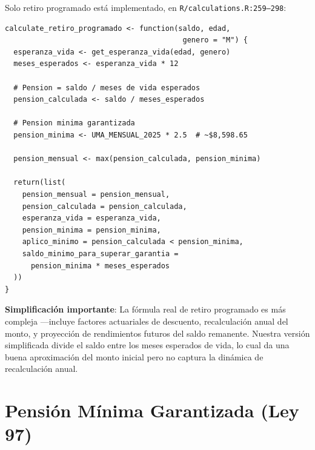 \documentclass[11pt,a4paper]{report}
\begin{document}
\begin{tcolorbox}[colback=orange!5!white, colframe=orange!75!black, title=\textbf{Aplicaci\'on en C\'odigo}]
Solo retiro programado est\'a implementado, en \texttt{R/calculations.R:259--298}:

\begin{lstlisting}
calculate_retiro_programado <- function(saldo, edad,
                                         genero = "M") {
  esperanza_vida <- get_esperanza_vida(edad, genero)
  meses_esperados <- esperanza_vida * 12

  # Pension = saldo / meses de vida esperados
  pension_calculada <- saldo / meses_esperados

  # Pension minima garantizada
  pension_minima <- UMA_MENSUAL_2025 * 2.5  # ~$8,598.65

  pension_mensual <- max(pension_calculada, pension_minima)

  return(list(
    pension_mensual = pension_mensual,
    pension_calculada = pension_calculada,
    esperanza_vida = esperanza_vida,
    pension_minima = pension_minima,
    aplico_minimo = pension_calculada < pension_minima,
    saldo_minimo_para_superar_garantia =
      pension_minima * meses_esperados
  ))
}
\end{lstlisting}

\textbf{Simplificaci\'on importante}: La f\'ormula real de retiro programado es m\'as compleja ---incluye factores actuariales de descuento, recalculaci\'on anual del monto, y proyecci\'on de rendimientos futuros del saldo remanente. Nuestra versi\'on simplificada divide el saldo entre los meses esperados de vida, lo cual da una buena aproximaci\'on del monto inicial pero no captura la din\'amica de recalculaci\'on anual.
\end{tcolorbox}

\section{Pensi\'on M\'inima Garantizada (Ley 97)}
\end{document}
